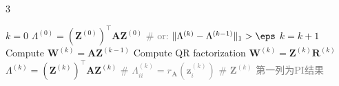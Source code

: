 \documentclass{note}
\begin{document}
\begin{multicols}{3}
\begin{algorithm}[H]
\begin{algorithmic}[1]
  \State $k = 0$
  \State $\Lambda^{(0)} = (\mathbf{Z}^{(0)})^\top \mathbf{A} \mathbf{Z}^{(0)}$
   \quad \textcolor{gray}{\tiny \# or: $\|\Lambda^{(k)} - \Lambda^{(k-1)}\|_1 > \eps$}
    \State $k = k + 1$
    \State Compute $\mathbf{W}^{(k)} = \mathbf{A} \mathbf{Z}^{(k-1)}$
    \State Compute QR factorization $\mathbf{W}^{(k)} = \mathbf{Z}^{(k)} \mathbf{R}^{(k)}$
    \State $\Lambda^{(k)} = (\mathbf{Z}^{(k)})^\top \mathbf{A} \mathbf{Z}^{(k)}$ \quad \textcolor{gray}{\tiny \# $\Lambda^{(k)}_{ii}=r_{\mathbf{A}}(\mathbf{z}_i^{(k)})$ }
  \EndWhile \quad \textcolor{gray}{\tiny \# $\mathbf{Z}^{(k)}$ 第一列为PI结果}
\end{algorithmic}
\end{algorithm}

\end{multicols}
\end{document}
